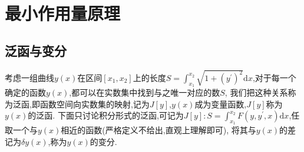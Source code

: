 \chapter{最小作用量原理}

\section{泛函与变分}
考虑一组曲线$y(x)$在区间$[x_1,x_2]$上的长度$\displaystyle{S=\int_{x_1}^{x_2}\sqrt{1+{(y^\prime)}^2}\mathrm{d}x}$,对于每一个确定的函数$y(x)$,都可以在实数集中找到与之唯一对应的数$S$,
我们把这种关系称为泛函,即函数空间向实数集的映射,记为$J[y]$,$y(x)$成为变量函数,$J[y]$称为$y(x)$的泛函.
下面只讨论积分形式的泛函,可记为$J[y]:\displaystyle{S=\int_{x_1}^{x_2}F(y,y^\prime,x)\mathrm{d}x}$,任取一个与$y(x)$相近的函数(严格定义不给出,直观上理解即可),
将其与$y(x)$的差记为$\delta y(x)$,称为$y(x)$的变分.

